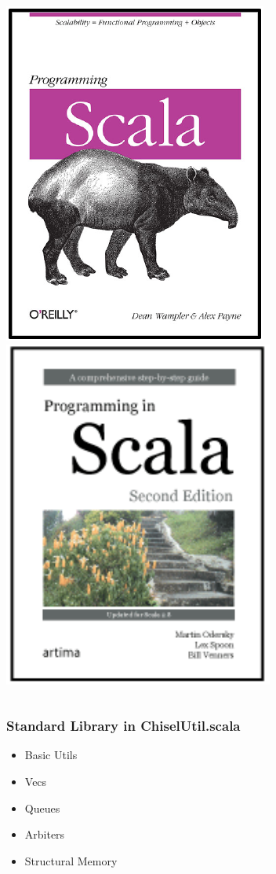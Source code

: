 \documentclass[xcolor=pdflatex,dvipsnames,table]{beamer}
\begin{document}
\begin{frame}
\begin{columns}
\begin{center}
\includegraphics[height=0.4\textheight]{../bootcamp/figs/programming-scala.pdf} \\
\includegraphics[height=0.4\textheight]{../bootcamp/figs/programming-in-scala.pdf}
\end{center}

\end{columns}
\end{frame}

\begin{frame}
\frametitle{Standard Library in ChiselUtil.scala}
\begin{itemize}
\item Basic Utils
\item Vecs
\item Queues
\item Arbiters
\item Structural Memory
\end{itemize}
\end{frame}
\end{document}
